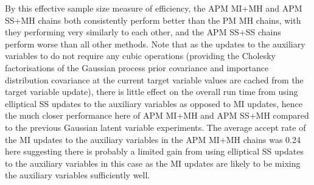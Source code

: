 By this effective sample size measure of efficiency, the \ac{APM} \ac{MI}+\ac{MH} and \ac{APM} \ac{SS}+\ac{MH} chains both consistently perform better than the \ac{PM} \ac{MH} chains, with they performing very similarly to each other, and the \ac{APM} \ac{SS}+\ac{SS} chains perform worse than all other methods. Note that as the updates to the auxiliary variables to do not require any cubic operations (providing the Cholesky factorisations of the Gaussian process prior covariance and importance distribution covariance at the current target variable values are cached from the target variable update), there is little effect on the overall run time from using elliptical \ac{SS} updates to the auxiliary variables as opposed to \ac{MI} updates, hence the much closer performance here of \ac{APM} \ac{MI}+\ac{MH} and \ac{APM} \ac{SS}+\ac{MH} compared to the previous Gaussian latent variable experiments. The average accept rate of the \ac{MI} updates to the auxiliary variables in the \ac{APM} \ac{MI}+\ac{MH} chains was 0.24 here suggesting there is probably a limited gain from using elliptical \ac{SS} updates to the auxiliary variables in this case as the \ac{MI} updates are likely to be mixing the auxiliary variables sufficiently well.%

